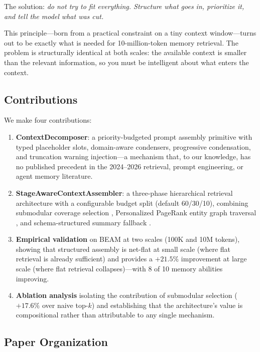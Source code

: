 \documentclass[11pt]{article}
\begin{document}
The solution: \emph{do not try to fit everything.  Structure what
goes in, prioritize it, and tell the model what was cut.}

This principle---born from a practical constraint on a tiny context
window---turns out to be exactly what is needed for 10-million-token
memory retrieval.  The problem is structurally identical at both
scales: the available context is smaller than the relevant information,
so you must be intelligent about what enters the context.

\subsection{Contributions}
\label{sec:contributions}

We make four contributions:

\begin{enumerate}
  \item \textbf{ContextDecomposer}: a priority-budgeted prompt
    assembly primitive with typed placeholder slots, domain-aware
    condensers, progressive condensation, and truncation warning
    injection---a mechanism that, to our knowledge, has no published
    precedent in the 2024--2026 retrieval, prompt engineering, or
    agent memory literature.

  \item \textbf{StageAwareContextAssembler}: a three-phase
    hierarchical retrieval architecture with a configurable budget
    split (default 60/30/10), combining submodular coverage selection
    \citep{Krause2008}, Personalized PageRank entity graph traversal
    \citep{Gutierrez2024}, and schema-structured summary fallback
    \citep{Tse2007}.

  \item \textbf{Empirical validation} on BEAM at two scales (100K
    and 10M tokens), showing that structured assembly is net-flat at
    small scale (where flat retrieval is already sufficient) and
    provides a $+21.5\%$ improvement at large scale (where flat
    retrieval collapses)---with 8 of 10 memory abilities improving.

  \item \textbf{Ablation analysis} isolating the contribution of
    submodular selection ($+17.6\%$ over naive top-$k$) and
    establishing that the architecture's value is compositional
    rather than attributable to any single mechanism.
\end{enumerate}

\subsection{Paper Organization}
\label{sec:organization}
\end{document}
